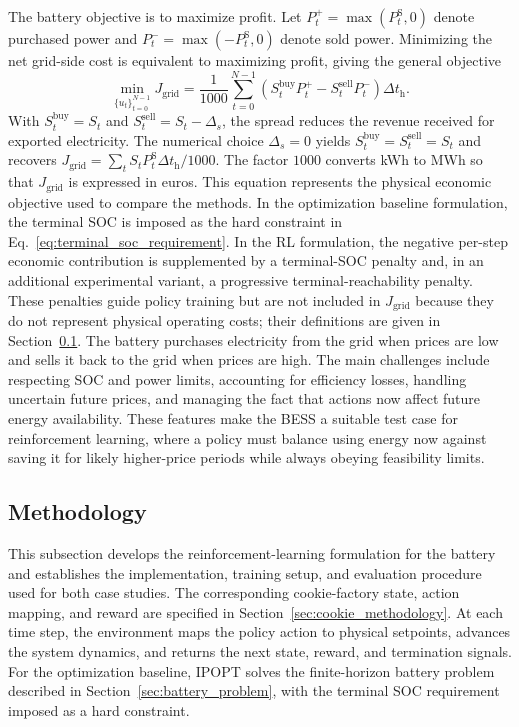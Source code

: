 \documentclass[12pt]{article}
\begin{document}
The battery objective is to maximize profit. Let $P_t^+=\max(P_t^{\mathrm S},0)$ denote purchased power and $P_t^-=\max(-P_t^{\mathrm S},0)$ denote sold power. Minimizing the net grid-side cost is equivalent to maximizing profit, giving the general objective
\[
\min_{\{u_t\}_{t=0}^{N-1}} J_{\mathrm{grid}}
= \frac{1}{1000}\sum_{t=0}^{N-1}
\left(S_t^{\mathrm{buy}}P_t^+-S_t^{\mathrm{sell}}P_t^-\right)\Delta t_{\mathrm h}.
\]
With $S_t^{\mathrm{buy}}=S_t$ and $S_t^{\mathrm{sell}}=S_t-\Delta_s$, the spread reduces the revenue received for exported electricity. The numerical choice $\Delta_s=0$ yields $S_t^{\mathrm{buy}}=S_t^{\mathrm{sell}}=S_t$ and recovers $J_{\mathrm{grid}}=\sum_t S_tP_t^{\mathrm S}\Delta t_{\mathrm h}/1000$. The factor $1000$ converts kWh to MWh so that $J_{\mathrm{grid}}$ is expressed in euros. This equation represents the physical economic objective used to compare the methods. In the optimization baseline formulation, the terminal SOC is imposed as the hard constraint in Eq.~\eqref{eq:terminal_soc_requirement}. In the RL formulation, the negative per-step economic contribution is supplemented by a terminal-SOC penalty and, in an additional experimental variant, a progressive terminal-reachability penalty. These penalties guide policy training but are not included in $J_{\mathrm{grid}}$ because they do not represent physical operating costs; their definitions are given in Section~\ref{sec:battery_methodology}. The battery purchases electricity from the grid when prices are low and sells it back to the grid when prices are high. The main challenges include respecting SOC and power limits, accounting for efficiency losses, handling uncertain future prices, and managing the fact that actions now affect future energy availability. These features make the BESS a suitable test case for reinforcement learning, where a policy must balance using energy now against saving it for likely higher-price periods while always obeying feasibility limits.

\FloatBarrier
\subsection{Methodology}
\label{sec:battery_methodology}

This subsection develops the reinforcement-learning formulation for the battery and establishes the implementation, training setup, and evaluation procedure used for both case studies. The corresponding cookie-factory state, action mapping, and reward are specified in Section~\ref{sec:cookie_methodology}. At each time step, the environment maps the policy action to physical setpoints, advances the system dynamics, and returns the next state, reward, and termination signals. For the optimization baseline, IPOPT solves the finite-horizon battery problem described in Section~\ref{sec:battery_problem}, with the terminal SOC requirement imposed as a hard constraint.
\end{document}
